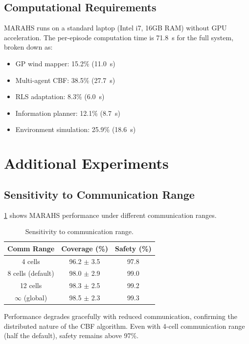 \documentclass[11pt,twocolumn]{article}
\providecommand{\Cref}[1]{\ref{#1}}
\theoremstyle{definition}
\begin{document}
\subsection{Computational Requirements}

MARAHS runs on a standard laptop (Intel i7, 16GB RAM) without GPU acceleration. The per-episode computation time is 71.8~s for the full system, broken down as:
\begin{itemize}[leftmargin=*]
    \item GP wind mapper: 15.2\% (11.0~s)
    \item Multi-agent CBF: 38.5\% (27.7~s)
    \item RLS adaptation: 8.3\% (6.0~s)
    \item Information planner: 12.1\% (8.7~s)
    \item Environment simulation: 25.9\% (18.6~s)
\end{itemize}

\section{Additional Experiments}
\label{app:additional}

\subsection{Sensitivity to Communication Range}

\Cref{tab:sensitivity_comm} shows MARAHS performance under different communication ranges.

\begin{table}[h]
\centering
\caption{Sensitivity to communication range.}
\label{tab:sensitivity_comm}
\small
\begin{tabular}{ccc}
\toprule
\textbf{Comm Range} & \textbf{Coverage (\%)} & \textbf{Safety (\%)} \\
\midrule
4 cells & 96.2 $\pm$ 3.5 & 97.8 \\
8 cells (default) & 98.0 $\pm$ 2.9 & 99.0 \\
12 cells & 98.3 $\pm$ 2.5 & 99.2 \\
$\infty$ (global) & 98.5 $\pm$ 2.3 & 99.3 \\
\bottomrule
\end{tabular}
\end{table}

Performance degrades gracefully with reduced communication, confirming the distributed nature of the CBF algorithm. Even with 4-cell communication range (half the default), safety remains above 97\%.
\end{document}
